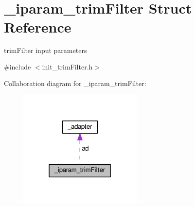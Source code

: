 \hypertarget{struct__iparam__trimFilter}{\section{\+\_\+iparam\+\_\+trim\+Filter Struct Reference}
\label{struct__iparam__trimFilter}
}


trim\+Filter input parameters  




{\ttfamily \#include $<$init\+\_\+trim\+Filter.\+h$>$}



Collaboration diagram for \+\_\+iparam\+\_\+trim\+Filter\+:\nopagebreak
\begin{figure}[H]
\begin{center}
\leavevmode
\includegraphics[width=175pt]{struct__iparam__trimFilter__coll__graph}
\end{center}
\end{figure}

